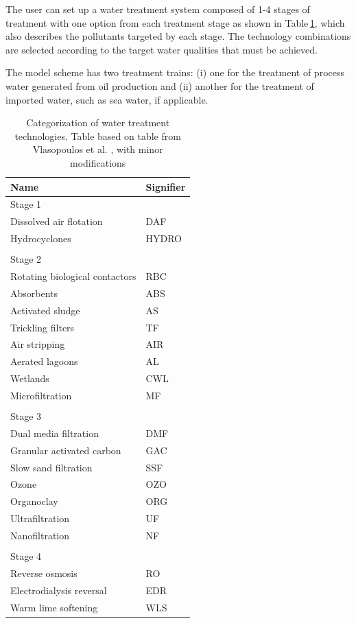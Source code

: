 \documentclass[11pt]{report}
\begin{document}
The user can set up a water treatment system composed of 1-4 stages of treatment with one option from each treatment stage as shown in Table\,\ref{tab:stages}, which also describes the pollutants targeted by each stage. The technology combinations are selected according to the target water qualities that must be achieved.

The model scheme has two treatment trains: (i) one for the treatment of process water generated from oil production and (ii) another for the treatment of imported water, such as sea water, if applicable. 

\begin{table}
\begin{scriptsize}
\caption{Categorization of water treatment technologies. Table based on table from Vlasopoulos et al. \cite{Vlasopoulos2006}, with minor modifications}
\label{tab:stages}
\begin{tabular*}{0.75\columnwidth}{p{}p{}}
\toprule
Name & Signifier \\
\midrule
Stage 1 & \\
\midrule
Dissolved air flotation & DAF \\
Hydrocyclones & HYDRO \\ 
& \\
Stage 2 & \\
\midrule
Rotating biological contactors & RBC \\
Absorbents & ABS \\ 
Activated sludge & AS \\
Trickling filters & TF \\
Air stripping & AIR \\
Aerated lagoons & AL \\
Wetlands & CWL \\ 
Microfiltration & MF \\
& \\
Stage 3 & \\
\midrule
Dual media filtration & DMF \\ 
Granular activated carbon & GAC \\
Slow sand filtration & SSF \\
Ozone & OZO \\ 
Organoclay & ORG \\ 
Ultrafiltration & UF\\ 
Nanofiltration & NF \\ 
& \\
Stage 4 & \\ 
\midrule
Reverse osmosis & RO \\ 
Electrodialysis reversal & EDR \\ 
Warm lime softening & WLS \\
\bottomrule
\end{tabular*}
\end{scriptsize}
\end{table}
\end{document}
